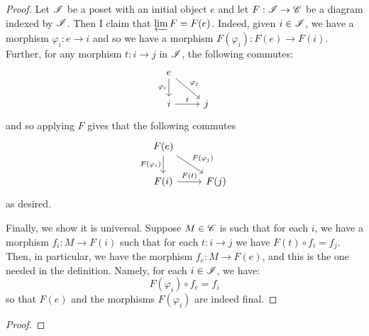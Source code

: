 \documentclass[12pt]{exam}
\begin{document}
\begin{proof}
	Let $\mathscr{I}$ be a poset with an initial object $e$ and let $F : \mathscr{I} \to \mathscr{C}$ be a diagram indexed by $\mathscr{I}$. Then I claim that $\varprojlim F = F(e)$. Indeed, given $i \in \mathscr{I}$, we have a morphism $\varphi_i : e \to i$ and so we have a morphism $F(\varphi_i) : F(e) \to F(i)$. Further, for any morphism $t : i \to j$ in $\mathscr{I}$, the following commutes:
	\[ \begin{tikzcd} e \arrow[swap]{d}{\varphi_i} \arrow{dr}{\varphi_j} \\ i \arrow{r}{t} & j \end{tikzcd} \]
	and so applying $F$ gives that the following commutes
	\[ \begin{tikzcd} F(e) \arrow[swap]{d}{F(\varphi_i)} \arrow{dr}{F(\varphi_j)} \\ F(i) \arrow{r}{F(t)} & F(j) \end{tikzcd} \]
	as desired.
	
	Finally, we show it is universal. Suppose $M \in \mathscr{C}$ is such that for each $i$, we have a morphism $f_i : M \to F(i)$ such that for each $t : i \to j$ we have $F(t) \circ f_i = f_j$. Then, in particular, we have the morphism $f_e : M \to F(e)$, and this is the one needed in the definition. Namely, for each $i \in \mathscr{I}$, we have:
	\[ F(\varphi_i) \circ f_e = f_i \]
	so that $F(e)$ and the morphisms $F(\varphi_i)$ are indeed final.
\end{proof}

\begin{proof}
\end{proof}
\end{document}
